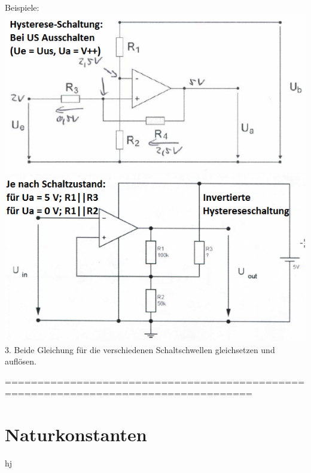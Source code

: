 \documentclass[fs, footer]{latex4ei}
\begin{document}
\begin{multicols*}{4}
{ Beispiele: \\
 \includegraphics[scale = 0.4]{./img/Hystereseschaltung.png} \\
 \includegraphics[scale = 0.4]{./img/Hystereseschaltung_invert.png} \\
 

3. Beide Gleichung für die verschiedenen Schaltschwellen gleichsetzen und auflösen.
}


%
====================================================================================
\section{Naturkonstanten}


\end{multicols*}

hj

\end{document}
